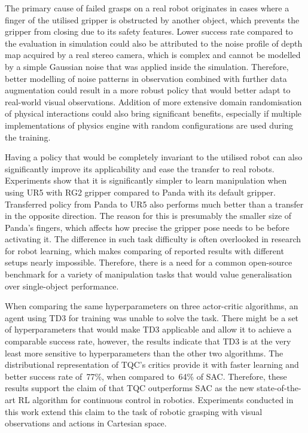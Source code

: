 The primary cause of failed grasps on a real robot originates in cases where a finger of the utilised gripper is obstructed by another object, which prevents the gripper from closing due to its safety features. Lower success rate compared to the evaluation in simulation could also be attributed to the noise profile of depth map acquired by a real stereo camera, which is complex and cannot be modelled by a simple Gaussian noise that was applied inside the simulation. Therefore, better modelling of noise patterns in observation combined with further data augmentation could result in a more robust policy that would better adapt to real-world visual observations. Addition of more extensive domain randomisation of physical interactions could also bring significant benefits, especially if multiple implementations of physics engine with random configurations are used during the training.

Having a policy that would be completely invariant to the utilised robot can also significantly improve its applicability and ease the transfer to real robots. Experiments show that it is significantly simpler to learn manipulation when using UR5 with RG2 gripper compared to Panda with its default gripper. Transferred policy from Panda to UR5 also performs much better than a transfer in the opposite direction. The reason for this is presumably the smaller size of Panda's fingers, which affects how precise the gripper pose needs to be before activating it. The difference in such task difficulty is often overlooked in research for robot learning, which makes comparing of reported results with different setups nearly impossible. Therefore, there is a need for a common open-source benchmark for a variety of manipulation tasks that would value generalisation over single-object performance.

When comparing the same hyperparameters on three actor-critic algorithms, an agent using TD3 for training was unable to solve the task. There might be a set of hyperparameters that would make TD3 applicable and allow it to achieve a comparable success rate, however, the results indicate that TD3 is at the very least more sensitive to hyperparameters than the other two algorithms. The distributional representation of TQC's critics provide it with faster learning and better success rate of~77\%, when compared to~64\% of SAC. Therefore, these results support the claim of \citet{kuznetsov_controlling_2020} that TQC outperforms SAC as the new state-of-the-art RL algorithm for continuous control in robotics. Experiments conducted in this work extend this claim to the task of robotic grasping with visual observations and actions in Cartesian space.

